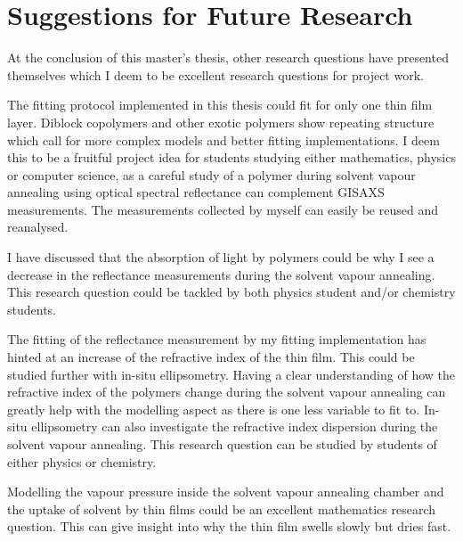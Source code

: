 \documentclass[MasterThesisMain.tex]{subfiles}
\begin{document}
\chapter{Suggestions for Future Research}
At the conclusion of this master's thesis, other research questions have presented themselves which I deem to be excellent research questions for project work. 

The fitting protocol implemented in this thesis could fit for only one thin film layer. Diblock copolymers and other exotic polymers show repeating structure which call for more complex models and better fitting implementations. I deem this to be a fruitful project idea for students studying either mathematics, physics or computer science, as a careful study of a polymer during solvent vapour annealing using optical spectral reflectance can complement GISAXS measurements. The measurements collected by myself can easily be reused and reanalysed.    

I have discussed that the absorption of light by polymers could be why I see a decrease in the reflectance measurements during the solvent vapour annealing. This research question could be tackled by both physics student and/or chemistry students.  

The fitting of the reflectance measurement by my fitting implementation has hinted at an increase of the refractive index of the thin film. This could be studied further with in-situ ellipsometry. Having a clear understanding of how the refractive index of the polymers change during the solvent vapour annealing can greatly help with the modelling aspect as there is one less variable to fit to. In-situ ellipsometry can also investigate the refractive index dispersion during the solvent vapour annealing. This research question can be studied by students of either physics or chemistry. 

Modelling the vapour pressure inside the solvent vapour annealing chamber and the uptake of solvent by thin films could be an excellent mathematics research question. This can give insight into why the thin film swells slowly but dries fast.
\end{document}
